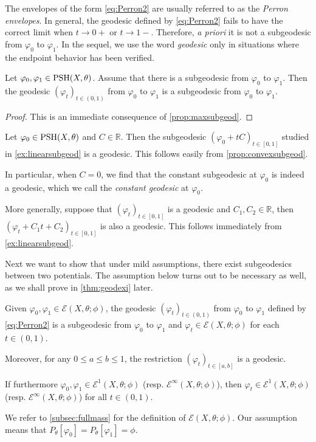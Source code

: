 The envelopes of the form \eqref{eq:Perron2} are usually referred to as the \emph{Perron envelopes}. In general, the geodesic defined by \eqref{eq:Perron2} fails to have the correct limit when $t\to 0+$ or $t\to 1-$. Therefore, \emph{a priori} it is not a subgeodesic from $\varphi_0$ to $\varphi_1$. In the sequel, we use the word \emph{geodesic} only in situations where the endpoint behavior has been verified.

\begin{lemma}\label{lma:geodsubgeod}
    Let $\varphi_0,\varphi_1\in \mathrm{PSH}(X,\theta)$. Assume that there is a subgeodesic from $\varphi_0$ to $\varphi_1$. Then the geodesic $(\varphi_t)_{t\in (0,1)}$ from $\varphi_0$ to $\varphi_1$ is a subgeodesic from $\varphi_0$ to $\varphi_1$.
\end{lemma}
\begin{proof}
    This is an immediate consequence of \cref{prop:maxsubgeod}.
\end{proof}



\begin{example}\label{ex:lineargeod}
    Let $\varphi_0\in \mathrm{PSH}(X,\theta)$ and $C\in \mathbb{R}$. Then the subgeodesic $(\varphi_0+tC)_{t\in [0,1]}$ studied in \cref{ex:linearsubgeod} is a geodesic. This follows easily from \cref{prop:convexsubgeod}.

    In particular, when $C=0$, we find that the constant subgeodesic at $\varphi_0$ is indeed a geodesic, which we call the \emph{constant geodesic} at $\varphi_0$.

    More generally, suppose that $(\varphi_t)_{t\in [0,1]}$ is a geodesic and $C_1,C_2\in \mathbb{R}$, then $(\varphi_t+C_1t+C_2)_{t\in [0,1]}$ is also a geodesic. This follows immediately from \cref{ex:linearsubgeod}.
\end{example}

Next we want to show that under mild assumptions, there exist subgeodesics between two potentials. The assumption below turns out to be necessary as well, as we shall prove in \cref{thm:geodexi} later.
\begin{proposition}\label{prop:perronenvissubgeod}
Given $\varphi_0, \varphi_1 \in \mathcal{E}(X,\theta;\phi)$, the geodesic $(\varphi_t)_{t\in (0,1)}$ from $\varphi_0$ to $\varphi_1$ defined by \eqref{eq:Perron2} is a subgeodesic from $\varphi_0$ to $\varphi_1$ and $\varphi_t\in \mathcal{E}(X,\theta;\phi)$ for each $t\in (0,1)$.

Moreover, for any $0\leq a\leq b\leq 1$, the restriction $(\varphi_t)_{t\in [a,b]}$ is a geodesic.

If furthermore $\varphi_0,\varphi_1\in \mathcal{E}^1(X,\theta;\phi)$ (resp. $\mathcal{E}^{\infty}(X,\theta;\phi)$), then $\varphi_t\in \mathcal{E}^1(X,\theta;\phi)$ (resp. $\mathcal{E}^{\infty}(X,\theta;\phi)$) for all $t\in (0,1)$.
\end{proposition}
We refer to \cref{subsec:fullmass} for the definition of $\mathcal{E}(X,\theta;\phi)$. Our assumption means that $P_{\theta}[\varphi_0]=P_{\theta}[\varphi_1]=\phi$.

